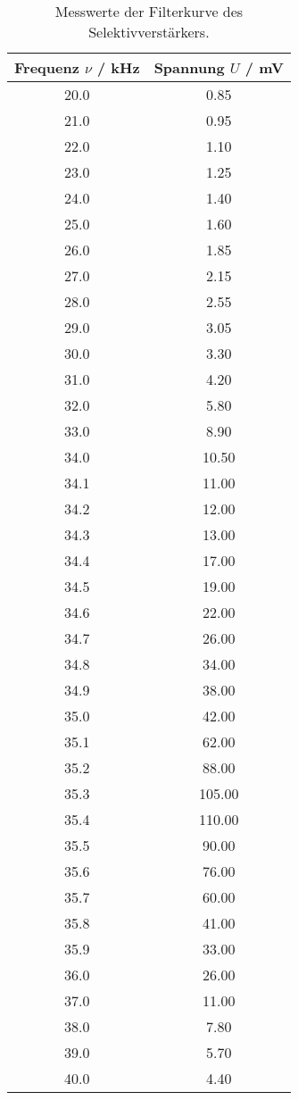 \begin{table}[!htp]
\centering
\caption{Messwerte der Filterkurve des Selektivverstärkers.}
\label{tab:selektiv}
\begin{tabular}{c c}
\toprule
{Frequenz $\nu$ / kHz} & {Spannung $U$ / mV} \\
\midrule
20.0 & 0.85 \\
21.0 & 0.95 \\
22.0 & 1.10 \\
23.0 & 1.25 \\
24.0 & 1.40 \\
25.0 & 1.60 \\
26.0 & 1.85 \\
27.0 & 2.15 \\
28.0 & 2.55 \\
29.0 & 3.05 \\
30.0 & 3.30 \\
31.0 & 4.20 \\
32.0 & 5.80 \\
33.0 & 8.90 \\
34.0 & 10.50 \\
34.1 & 11.00 \\
34.2 & 12.00 \\
34.3 & 13.00 \\
34.4 & 17.00 \\
34.5 & 19.00 \\
34.6 & 22.00 \\
34.7 & 26.00 \\
34.8 & 34.00 \\
34.9 & 38.00 \\
35.0 & 42.00 \\
35.1 & 62.00 \\
35.2 & 88.00 \\
35.3 & 105.00 \\
35.4 & 110.00 \\
35.5 & 90.00 \\
35.6 & 76.00 \\
35.7 & 60.00 \\
35.8 & 41.00 \\
35.9 & 33.00 \\
36.0 & 26.00 \\
37.0 & 11.00 \\
38.0 & 7.80 \\
39.0 & 5.70 \\
40.0 & 4.40 \\
\bottomrule
\end{tabular}
\end{table}